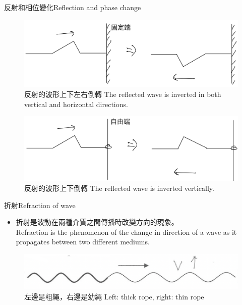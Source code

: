 \documentclass[beamer=true]{standalone}
\begin{document}
\begin{frame}{反射和相位變化Reflection and phase change}
    \begin{figure}
        \centering
        \includegraphics[width=0.75\linewidth]{images/IMG_6F6A16553544-1.jpeg}
        \caption{反射的波形上下左右倒轉 The reflected wave is inverted in both vertical and horizontal directions.}
    \end{figure}
    \begin{figure}
        \centering
        \includegraphics[width=0.75\linewidth]{images/IMG_CBCFA4B99FBF-1.jpeg}
        \caption{反射的波形上下倒轉 The reflected wave is inverted vertically.}
    \end{figure}

\end{frame}



\begin{frame}{折射Refraction of wave}
    \begin{itemize}
        \item
              折射是波動在兩種介質之間傳播時改變方向的現象。\\Refraction is the phenomenon of the change in direction of a wave as it propagates between two different mediums.
    \end{itemize}\bigskip \bigskip
    \begin{figure}
        \centering
        \includegraphics[width=0.75\linewidth]{images/Screenshot 2023-09-27 at 7.33.45 PM.png}
        \caption{左邊是粗繩，右邊是幼繩 Left: thick rope, right: thin rope}
    \end{figure}
\end{frame}
\end{document}
